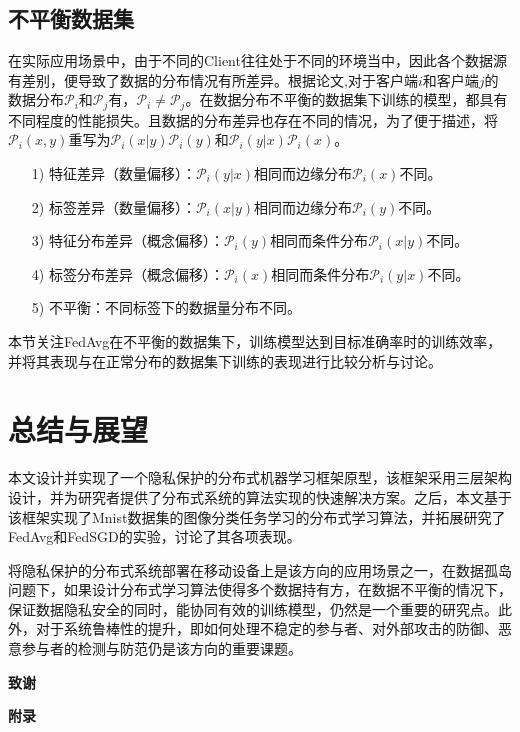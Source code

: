 \documentclass[zihao = -4,cn]{oucart}
\begin{document}
\subsection{不平衡数据集}
在实际应用场景中，由于不同的Client往往处于不同的环境当中，因此各个数据源有差别，便导致了数据的分布情况有所差异。根据论文\cite{hsieh2019non},对于客户端$i$和客户端$j$的数据分布$\mathcal{P}_i$和$\mathcal{P}_j$有，$\mathcal{P}_i \not= \mathcal{P}_j$。在数据分布不平衡的数据集下训练的模型，都具有不同程度的性能损失。且数据的分布差异也存在不同的情况，为了便于描述，将$\mathcal{P}_i(x,y)$重写为$\mathcal{P}_i(x|y)\mathcal{P}_i(y)$和$\mathcal{P}_i(y|x)\mathcal{P}_i(x)$。
\begin{itemize}
	\item [1)]
	特征差异（数量偏移）：$\mathcal{P}_i(y|x)$相同而边缘分布$\mathcal{P}_i(x)$不同。
	\item [2)]
	标签差异（数量偏移）：$\mathcal{P}_i(x|y)$相同而边缘分布$\mathcal{P}_i(y)$不同。
	\item [3)]
	特征分布差异（概念偏移）：$\mathcal{P}_i(y)$相同而条件分布$\mathcal{P}_i(x|y)$不同。
	\item [4)]
	标签分布差异（概念偏移）：$\mathcal{P}_i(x)$相同而条件分布$\mathcal{P}_i(y|x)$不同。
	\item [5)]
	不平衡：不同标签下的数据量分布不同。
\end{itemize}
\par
本节关注FedAvg在不平衡的数据集下，训练模型达到目标准确率时的训练效率，并将其表现与在正常分布的数据集下训练的表现进行比较分析与讨论。

\section{总结与展望}
本文设计并实现了一个隐私保护的分布式机器学习框架原型，该框架采用三层架构设计，并为研究者提供了分布式系统的算法实现的快速解决方案。之后，本文基于该框架实现了Mnist数据集的图像分类任务学习的分布式学习算法，并拓展研究了FedAvg和FedSGD的实验，讨论了其各项表现。\par
将隐私保护的分布式系统部署在移动设备上是该方向的应用场景之一，在数据孤岛问题下，如果设计分布式学习算法使得多个数据持有方，在数据不平衡的情况下，保证数据隐私安全的同时，能协同有效的训练模型，仍然是一个重要的研究点。此外，对于系统鲁棒性的提升，即如何处理不稳定的参与者、对外部攻击的防御、恶意参与者的检测与防范仍是该方向的重要课题。

\newpage
%


\newpage
\begin{center}
 \textbf{致谢} \\
\end{center}

\newpage
\begin{center}
 \textbf{附录} \\
\end{center}
\end{document}
